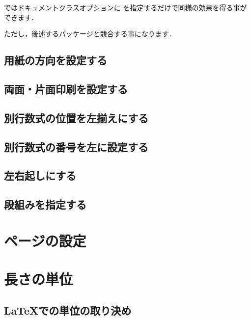%
%
ではドキュメントクラスオプションに 
を指定するだけで同様の効果を得る事ができます．


ただし，後述するパッケージと競合する事になります．


\subsection{用紙の方向を設定する}

\subsection{両面・片面印刷を設定する}

\subsection{別行数式の位置を左揃えにする}

\subsection{別行数式の番号を左に設定する}

\subsection{左右起しにする}

\subsection{段組みを指定する}

\section{ページの設定}

\section{長さの単位}
\subsection{\LaTeX での単位の取り決め}
%

